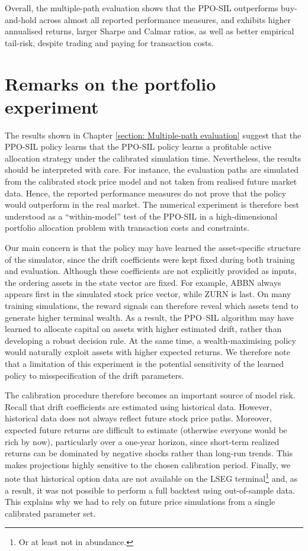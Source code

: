 Overall, the multiple-path evaluation shows that the PPO-SIL outperforms buy-and-hold across almost all reported performance measures, and exhibits higher annualised returns, larger Sharpe and Calmar ratios, as well as better empirical tail-risk, despite trading and paying for transaction costs.

\section{Remarks on the portfolio experiment}
The results shown in Chapter \ref{section: Multiple-path evaluation} suggest that the PPO-SIL policy learns that the PPO-SIL policy learns a profitable active allocation strategy under the calibrated simulation time. Nevertheless, the results should be interpreted with care. For instance, the evaluation paths are simulated from the calibrated stock price model and not taken from realised future market data. Hence, the reported performance measures do not prove that the policy would outperform in the real market. The numerical experiment is therefore best understood as a ``within-model'' test of the PPO-SIL in a high-dimensional portfolio allocation problem with transaction costs and constraints. 

Our main concern is that the policy may have learned the asset-specific structure of the simulator, since the drift coefficients were kept fixed during both training and evaluation. Although these coefficients are not explicitly provided as inputs, the ordering assets in the state vector are fixed. For example, ABBN always appears first in the simulated stock price vector, while ZURN is last. On many training simulations, the reward signals can therefore reveal which assets tend to generate higher terminal wealth. As a result, the PPO–SIL algorithm may have learned to allocate capital on assets with higher estimated drift, rather than developing a robust decision rule. At the same time, a wealth‑maximising policy would naturally exploit assets with higher expected returns. We therefore note that a limitation of this experiment is the potential sensitivity of the learned policy to misspecification of the drift parameters.

The calibration procedure therefore becomes an important source of model risk. Recall that drift coefficients are estimated using historical data. However, historical data does not always reflect future stock price paths. Moreover, expected future returns are difficult to estimate (otherwise everyone would be rich by now), particularly over a one-year horizon, since short-term realized returns can be dominated by negative shocks rather than long-run trends. This makes projections highly sensitive to the chosen calibration period. Finally, we note that historical option data are not available on the LSEG terminal\footnote{Or at least not in abundance.} and, as a result, it was not possible to perform a full backtest using out-of-sample data. This explains why we had to rely on future price simulations from a single calibrated parameter set.

